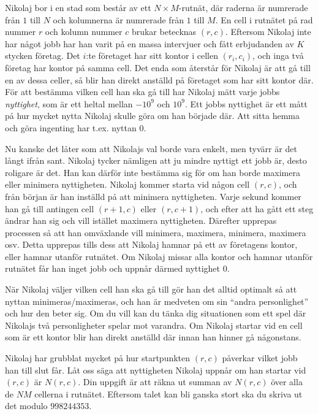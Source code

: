 Nikolaj bor i en stad som består av ett $N \times M$-rutnät, där raderna är numrerade från $1$ till $N$ och kolumnerna
är numrerade från $1$ till $M$. En cell i rutnätet på rad nummer $r$ och kolumn nummer $c$ brukar betecknas $(r, c)$.
Eftersom Nikolaj inte har något jobb har han varit 
på en massa intervjuer och fått erbjudanden av $K$ stycken företag. Det $i$:te företaget har sitt kontor i cellen 
$(r_i, c_i)$, och inga två företag har kontor på samma cell. Det enda som återstår för Nikolaj är att gå till en
 av dessa celler, så blir han direkt anställd på företaget som har sitt kontor där. För att bestämma vilken cell 
 han ska gå till har Nikolaj mätt varje jobbs \textit{nyttighet}, som är ett heltal mellan $-10^9$ och $10^9$.
 Ett jobbs nyttighet är ett mått på hur mycket nytta Nikolaj skulle göra om han började där. Att sitta hemma och 
 göra ingenting har t.ex. nyttan $0$.
 
 Nu kanske det låter som att Nikolajs val borde vara enkelt, men tyvärr är det långt ifrån sant. Nikolaj tycker nämligen att 
 ju mindre nyttigt ett jobb är, desto roligare är det. Han kan därför inte bestämma sig för om han borde maximera eller
 minimera nyttigheten. Nikolaj kommer starta vid någon cell $(r, c)$, och från början är han inställd på att minimera
 nyttigheten. Varje sekund kommer han gå till antingen cell $(r+1, c)$ eller $(r, c+1)$, och efter att ha gått ett steg
 ändrar han sig och vill istället maximera nyttigheten. Därefter upprepas processen så att han omväxlande vill minimera, maximera, 
 minimera, maximera osv. Detta upprepas tills dess att Nikolaj hamnar på ett av företagens kontor, eller hamnar utanför
 rutnätet. Om Nikolaj missar alla kontor och hamnar utanför rutnätet får han inget jobb och uppnår därmed nyttighet $0$.
 
 När Nikolaj väljer vilken cell han ska gå till gör han det alltid optimalt så att nyttan minimeras/maximeras, 
 och han är medveten om sin ``andra personlighet'' och hur den beter sig.
 Om du vill kan du tänka dig situationen som ett spel där Nikolajs två personligheter spelar mot varandra.
 Om Nikolaj startar vid en cell som är ett kontor blir han direkt anställd där innan han hinner gå någonstans.
 
 Nikolaj har grubblat mycket på hur startpunkten $(r, c)$ påverkar vilket jobb han till slut får. Låt oss säga 
 att nyttigheten Nikolaj uppnår om han startar vid $(r, c)$ är $N(r, c)$. Din uppgift är att räkna ut summan av 
 $N(r, c)$ över alla de $NM$ cellerna i rutnätet. Eftersom talet kan bli ganska stort ska du skriva ut det modulo $998244353$.
 

